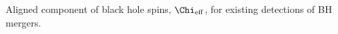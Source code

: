  \label{fig:BHspin} Aligned component of black hole spins, $\Chi_{\rm eff}$, for existing detections of BH mergers.